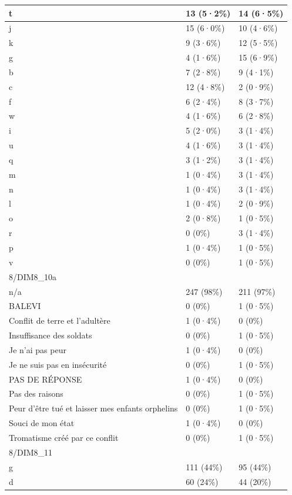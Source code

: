 \documentclass[
]{book}
\begin{document}
\begin{tabular}{l|l|l}
\hline
t & 13 (5·2\%) & 14 (6·5\%)\\
\hline
j & 15 (6·0\%) & 10 (4·6\%)\\
\hline
k & 9 (3·6\%) & 12 (5·5\%)\\
\hline
g & 4 (1·6\%) & 15 (6·9\%)\\
\hline
b & 7 (2·8\%) & 9 (4·1\%)\\
\hline
c & 12 (4·8\%) & 2 (0·9\%)\\
\hline
f & 6 (2·4\%) & 8 (3·7\%)\\
\hline
w & 4 (1·6\%) & 6 (2·8\%)\\
\hline
i & 5 (2·0\%) & 3 (1·4\%)\\
\hline
u & 4 (1·6\%) & 3 (1·4\%)\\
\hline
q & 3 (1·2\%) & 3 (1·4\%)\\
\hline
m & 1 (0·4\%) & 3 (1·4\%)\\
\hline
n & 1 (0·4\%) & 3 (1·4\%)\\
\hline
l & 1 (0·4\%) & 2 (0·9\%)\\
\hline
o & 2 (0·8\%) & 1 (0·5\%)\\
\hline
r & 0 (0\%) & 3 (1·4\%)\\
\hline
p & 1 (0·4\%) & 1 (0·5\%)\\
\hline
v & 0 (0\%) & 1 (0·5\%)\\
\hline
8/DIM8\_10a &  & \\
\hline
n/a & 247 (98\%) & 211 (97\%)\\
\hline
BALEVI & 0 (0\%) & 1 (0·5\%)\\
\hline
Conflit de terre et l'adultère & 1 (0·4\%) & 0 (0\%)\\
\hline
Insuffisance des soldats & 0 (0\%) & 1 (0·5\%)\\
\hline
Je n'ai pas peur & 1 (0·4\%) & 0 (0\%)\\
\hline
Je ne suis pas en insécurité & 0 (0\%) & 1 (0·5\%)\\
\hline
PAS DE RÉPONSE & 1 (0·4\%) & 0 (0\%)\\
\hline
Pas des raisons & 0 (0\%) & 1 (0·5\%)\\
\hline
Peur d'être tué et laisser mes enfants orphelins & 0 (0\%) & 1 (0·5\%)\\
\hline
Souci de mon état & 1 (0·4\%) & 0 (0\%)\\
\hline
Tromatisme créé par ce conflit & 0 (0\%) & 1 (0·5\%)\\
\hline
8/DIM8\_11 &  & \\
\hline
g & 111 (44\%) & 95 (44\%)\\
\hline
d & 60 (24\%) & 44 (20\%)\\

\end{tabular}
\end{document}
